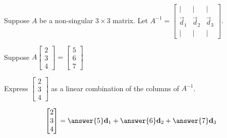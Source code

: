 \documentclass{ximera}
\author{Anna Davis}
\begin{document}
\begin{exercise}
Suppose $A$ be a non-singular $3\times 3$ matrix.  Let $A^{-1}=\begin{bmatrix}|&|&|\\\vec{d}_1& \vec{d}_2 & \vec{d}_3\\|&|&|\end{bmatrix}$.

Suppose $A\begin{bmatrix}2\\3\\4\end{bmatrix}=\begin{bmatrix}5\\6\\7\end{bmatrix}$

Express $\begin{bmatrix}2\\3\\4\end{bmatrix}$ as a linear combination of the columns of $A^{-1}$.

$$\begin{bmatrix}2\\3\\4\end{bmatrix}=\answer{5}\vec{d}_1+\answer{6}\vec{d}_2+\answer{7}\vec{d}_3$$
\end{exercise}
\end{document}
